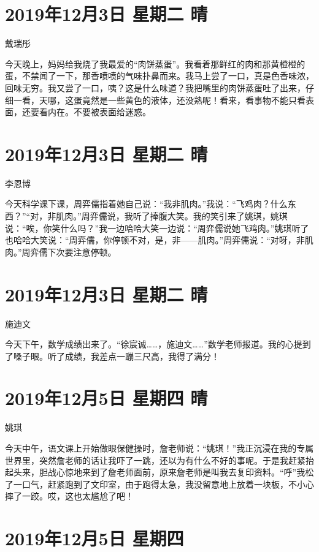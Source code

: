 \section{2019年12月3日 星期二 晴}

戴瑞彤

今天晚上，妈妈给我烧了我最爱的``肉饼蒸蛋''。我看着那鲜红的肉和那黄橙橙的蛋，不禁闻了一下，那香喷喷的气味扑鼻而来。我马上尝了一口，真是色香味浓，回味无穷。我又尝了一口，咦？这是什么味道？我把嘴里的肉饼蒸蛋吐了出来，仔细一看，天哪，这蛋竟然是一些黄色的液体，还没熟呢！看来，看事物不能只看表面，还要看内在。不要被表面给迷惑。

\section{2019年12月3日 星期二 晴}

李恩博

今天科学课下课，周弈儒指着她自己说：``我非肌肉。''我说：``飞鸡肉？什么东西？''``对，非肌肉。''周弈儒说，我听了捧腹大笑。我的笑引来了姚琪，姚琪说：``唉，你笑什么吗？''我一边哈哈大笑一边说：``周弈儒说她飞鸡肉。''姚琪听了也哈哈大笑说：``周弈儒，你停顿不对，是，非------肌肉。''周弈儒说：``对呀，非肌肉。''周弈儒下次要注意停顿。

\section{2019年12月3日 星期二 晴}

施迪文

今天下午，数学成绩出来了。``徐宸诚\ldots\ldots，施迪文\ldots\ldots{}''数学老师报道。我的心提到了嗓子眼。听了成绩，我差点一蹦三尺高，我得了满分！

\section{2019年12月5日 星期四 晴}

姚琪

今天中午，语文课上开始做眼保健操时，詹老师说：``姚琪！''我正沉浸在我的专属世界里，突然詹老师的话让我吓了一跳，还以为有什么不好的事呢。于是我赶紧抬起头来，胆战心惊地来到了詹老师面前，原来詹老师是叫我去复印资料。``呼''我松了一口气，赶紧跑到了文印室，由于跑得太急，我没留意地上放着一块板，不小心摔了一跤。哎，这也太尴尬了吧！

\section{2019年12月5日 星期四}

